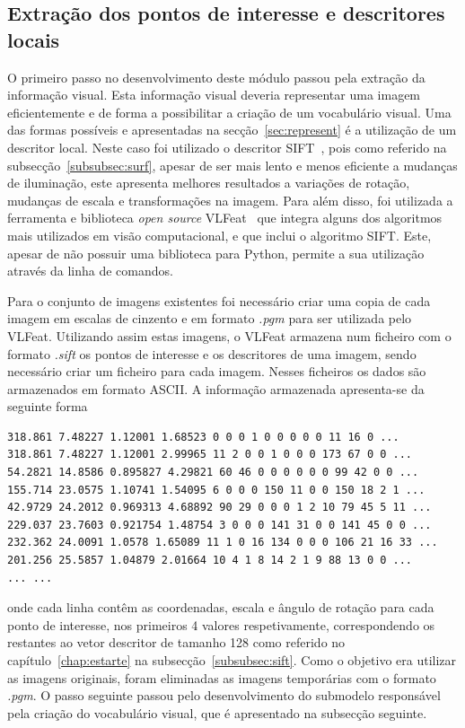 \subsection{Extração dos pontos de interesse e descritores locais}

O primeiro passo no desenvolvimento deste módulo passou pela extração da informação visual. Esta informação visual deveria representar uma imagem eficientemente e de forma a possibilitar a criação de um vocabulário visual. Uma das formas possíveis e apresentadas na secção~\ref{sec:represent} é a utilização de um descritor local. Neste caso foi utilizado o descritor SIFT~\cite{Lowe1999, Lowe2004}, pois como referido na subsecção~\ref{subsubsec:surf}, apesar de ser mais lento e menos eficiente a mudanças de iluminação, este apresenta melhores resultados a variações de rotação, mudanças de escala e transformações na imagem. Para além disso, foi utilizada a ferramenta e biblioteca \textit{open source} VLFeat~\cite{vedaldi08vlfeat} que integra alguns dos algoritmos mais utilizados em visão computacional, e que inclui o algoritmo SIFT. Este, apesar de não possuir uma biblioteca para Python, permite a sua utilização através da linha de comandos.

Para o conjunto de imagens existentes foi necessário criar uma copia de cada imagem em escalas de cinzento e em formato \textit{.pgm} para ser utilizada pelo VLFeat. Utilizando assim estas imagens, o VLFeat armazena num ficheiro com o formato \textit{.sift} os pontos de interesse e os descritores de uma imagem, sendo necessário criar um ficheiro para cada imagem. Nesses ficheiros os dados são armazenados em formato ASCII. 
A informação armazenada apresenta-se da seguinte forma 

\begin{lstlisting}
318.861 7.48227 1.12001 1.68523 0 0 0 1 0 0 0 0 0 11 16 0 ...
318.861 7.48227 1.12001 2.99965 11 2 0 0 1 0 0 0 173 67 0 0 ...
54.2821 14.8586 0.895827 4.29821 60 46 0 0 0 0 0 0 99 42 0 0 ...
155.714 23.0575 1.10741 1.54095 6 0 0 0 150 11 0 0 150 18 2 1 ...
42.9729 24.2012 0.969313 4.68892 90 29 0 0 0 1 2 10 79 45 5 11 ...
229.037 23.7603 0.921754 1.48754 3 0 0 0 141 31 0 0 141 45 0 0 ...
232.362 24.0091 1.0578 1.65089 11 1 0 16 134 0 0 0 106 21 16 33 ...
201.256 25.5857 1.04879 2.01664 10 4 1 8 14 2 1 9 88 13 0 0 ...
... ...
\end{lstlisting}

onde cada linha contêm as coordenadas, escala e ângulo de rotação para cada ponto de interesse, nos primeiros 4 valores respetivamente, correspondendo os restantes ao vetor descritor de tamanho 128 como referido no capítulo~\ref{chap:estarte} na subsecção~\ref{subsubsec:sift}. Como o objetivo era utilizar as imagens originais, foram eliminadas as imagens temporárias com o formato \textit{.pgm}. O passo seguinte passou pelo desenvolvimento do submodelo responsável pela criação do vocabulário visual, que é apresentado na subsecção seguinte.


